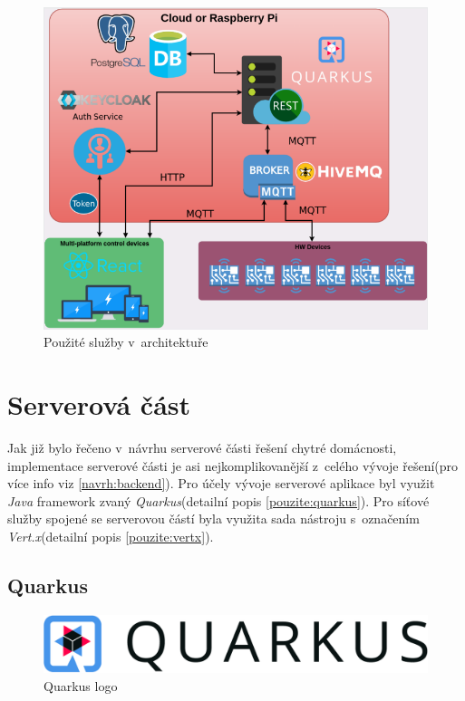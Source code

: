 \begin{figure}[hbt]
  \centering
  \includegraphics[width=0.9 \linewidth]{obrazky-figures/technologie.png}
  \caption{Použité služby v~architektuře}
  \label{figure:technologie_architektura}
\end{figure}

\newpage
\section{Serverová část}
\label{pouzite:backend}
Jak již bylo řečeno v~návrhu serverové části řešení chytré domácnosti, implementace serverové části je asi nejkomplikovanější z~celého vývoje řešení(pro více info viz \ref{navrh:backend}).
Pro účely vývoje serverové aplikace byl využit \emph{Java} framework zvaný \emph{Quarkus}(detailní popis \ref{pouzite:quarkus}).
Pro síťové služby spojené se serverovou částí byla využita sada nástroju s~označením \emph{Vert.x}(detailní popis \ref{pouzite:vertx}).

\subsection*{Quarkus}
\label{pouzite:quarkus}

\begin{figure}[!ht]
  \centering
  \includegraphics[width=.45 \linewidth]{obrazky-figures/quarkus_logo.png}
  \caption{Quarkus logo}
  \label{figure:quarkus_logo}
\end{figure}

